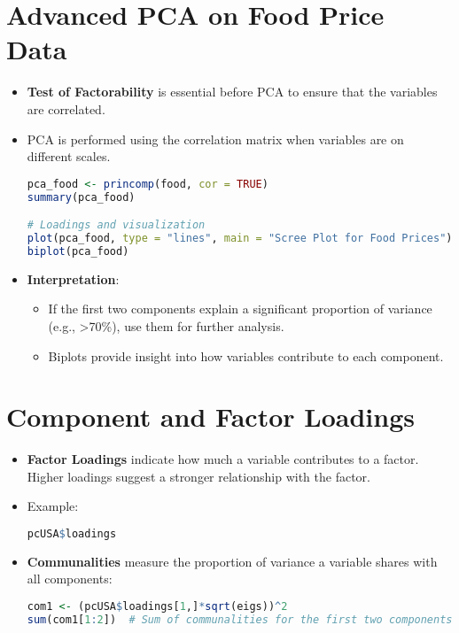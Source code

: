 \documentclass{article}
\begin{document}
\section{Advanced PCA on Food Price Data}
\begin{itemize}
    \item \textbf{Test of Factorability} is essential before PCA to ensure that the variables are correlated.
    \item PCA is performed using the correlation matrix when variables are on different scales.
\begin{lstlisting}[language=R]
pca_food <- princomp(food, cor = TRUE)
summary(pca_food)

# Loadings and visualization
plot(pca_food, type = "lines", main = "Scree Plot for Food Prices")
biplot(pca_food)
\end{lstlisting}

\item \textbf{Interpretation}:
    \begin{itemize}
        \item If the first two components explain a significant proportion of variance (e.g., >70\%), use them for further analysis.
        \item Biplots provide insight into how variables contribute to each component.
    \end{itemize}
\end{itemize}

\section{Component and Factor Loadings}
\begin{itemize}
    \item \textbf{Factor Loadings} indicate how much a variable contributes to a factor. Higher loadings suggest a stronger relationship with the factor.
    \item Example:
\begin{lstlisting}[language=R]
pcUSA$loadings
\end{lstlisting}

\item \textbf{Communalities} measure the proportion of variance a variable shares with all components:
\begin{lstlisting}[language=R]
com1 <- (pcUSA$loadings[1,]*sqrt(eigs))^2
sum(com1[1:2])  # Sum of communalities for the first two components
\end{lstlisting}
\end{itemize}
\end{document}
